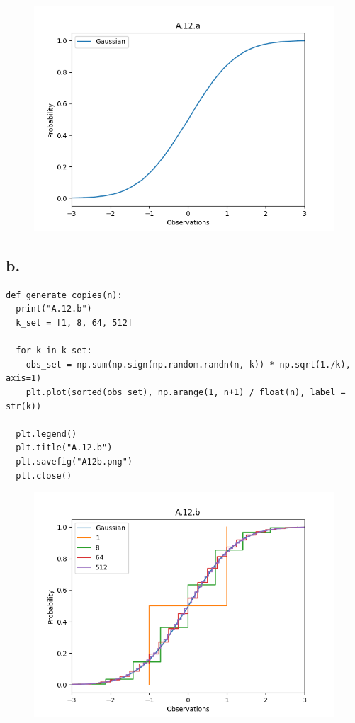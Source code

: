 \documentclass{article}
\newcommand{\1}{\mathbf{1}}
\begin{document}
{\begin{figure}[ht!]
  \centering
  \includegraphics[width=130mm]{A12a.PNG}
\end{figure}

\subsection*{b.}
\begin{verbatim}
def generate_copies(n):
  print("A.12.b")
  k_set = [1, 8, 64, 512]

  for k in k_set:
    obs_set = np.sum(np.sign(np.random.randn(n, k)) * np.sqrt(1./k), axis=1)
    plt.plot(sorted(obs_set), np.arange(1, n+1) / float(n), label = str(k))

  plt.legend()
  plt.title("A.12.b")
  plt.savefig("A12b.png")
  plt.close()
\end{verbatim}

\begin{figure}[ht!]
  \centering
  \includegraphics[width=130mm]{A12b.PNG}
\end{figure}

}
\end{document}
